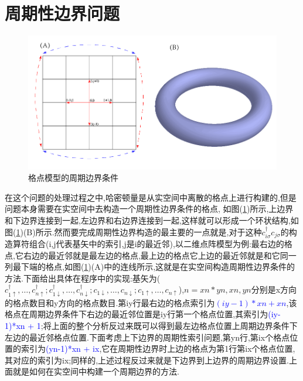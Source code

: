 \documentclass[a4paper,12pt]{ctexart}
\numberwithin{equation}{section}
\begin{document}
\section{周期性边界问题}
\begin{figure}[ht]
\centering
\includegraphics[scale=0.45]{periodic.png}
\caption{格点模型的周期边界条件}\label{per}
\end{figure}
在这个问题的处理过程之中,哈密顿量是从实空间中离散的格点上进行构建的,但是问题本身需要在实空间中去构造一个周期性边界条件的格点, 如图(\ref{per})所示,上边界和下边界连接到一起,左边界和右边界连接到一起,这样就可以形成一个环状结构,如图(\ref{per})(B)所示.然而要完成周期性边界构造的最主要的一点就是,对于这种$c_{i\sigma}^\dagger c_{j\sigma}$的构造算符组合(i,j代表基矢中的索引,j是i的最近邻),以二维点阵模型为例:最右边的格点,它右边的最近邻就是最左边的格点,最上边的格点它上边的最近邻就是和它同一列最下端的格点,如图(\ref{per})(A)中的连线所示,这就是在实空间构造周期性边界条件的方法.下面给出具体在程序中的实现:基矢为($c_{1\uparrow}^\dagger,\dots,c_{n\uparrow}^\dagger;c_{1\downarrow}^\dagger,\dots,c_{n\downarrow}^\dagger;c_{1\downarrow},\dots,c_{n\downarrow};c_{1\uparrow},\dots,c_{n\uparrow}$),$n=xn*yn,xn,yn$分别是x方向的格点数目和y方向的格点数目.第iy行最右边的格点索引为\textcolor{blue}{$(iy-1)*xn + xn$},该格点在周期边界条件下右边的最近邻位置是iy行第一个格点位置,其索引为\textcolor{blue}{(iy-1)*xn + 1};将上面的整个分析反过来既可以得到最左边格点位置上周期边界条件下左边的最近邻格点位置.下面考虑上下边界的周期性索引问题,第yn行,第ix个格点位置的索引为\textcolor{blue}{(yn-1)*xn + ix},它在周期性边界时上边的格点为第1行第ix个格点位置,其对应的索引为ix;同样的,上述过程反过来就是下边界到上边界的周期边界设置.上面就是如何在实空间中构建一个周期边界的方法.
\end{document}
